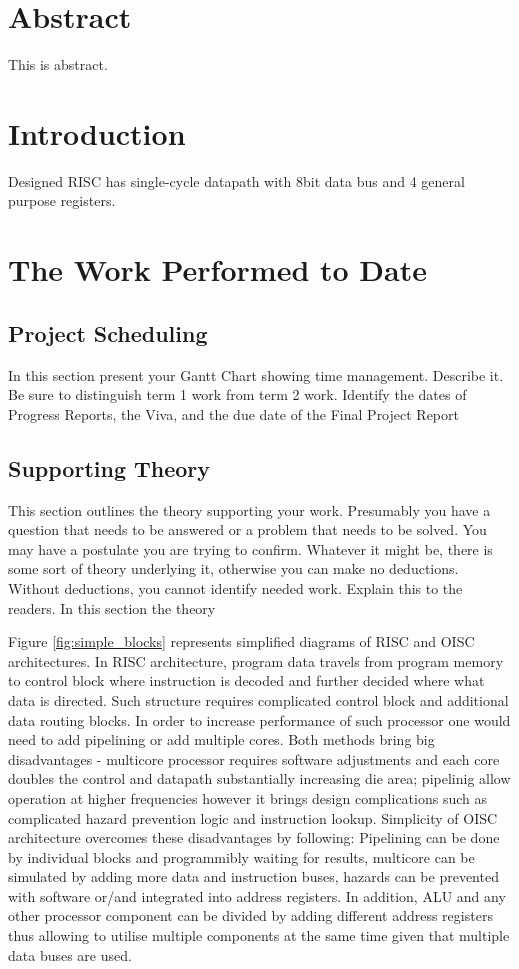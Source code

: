 \documentclass[a4paper,12pt]{article}
\begin{document}
\begin{multicols}{2}

\section{Abstract}
This is abstract.
\section{Introduction}
Designed RISC has single-cycle datapath with 8bit data bus and 4 general purpose registers.

\section{The Work Performed to Date}

\subsection{Project Scheduling}
In this section present your Gantt Chart showing time management. Describe it. Be sure to distinguish term 1 work from term 2 work. Identify the dates of Progress Reports, the Viva, and the due date of the Final Project Report

\subsection{Supporting Theory}
This section outlines the theory supporting your work. Presumably you have a question that needs to be answered or a problem that needs to be solved. You may have a postulate you are trying to confirm. Whatever it might be, there is some sort of theory underlying it, otherwise you can make no deductions. Without deductions, you cannot identify needed work. Explain this to the readers.
In this section the theory 


Figure \ref{fig:simple_blocks} represents simplified diagrams of RISC and OISC architectures. In RISC architecture, program data travels from program memory to control block where instruction is decoded and further decided where what data is directed. Such structure requires complicated control block and additional data routing blocks. In order to increase performance of such processor one would need to add pipelining or add multiple cores. Both methods bring big disadvantages - multicore processor requires software adjustments and each core doubles the control and datapath substantially increasing die area; pipelinig allow operation at higher frequencies however it brings design complications such as complicated hazard prevention logic and instruction lookup. Simplicity of OISC architecture overcomes these disadvantages by following:
Pipelining can be done by individual blocks and programmibly waiting for results, multicore can be simulated by adding more data and instruction buses, hazards can be prevented with software or/and integrated into address registers. 
In addition, ALU and any other processor component can be divided by adding different address registers thus allowing to utilise multiple components at the same time given that multiple data buses are used. 


\end{multicols}
\end{document}
